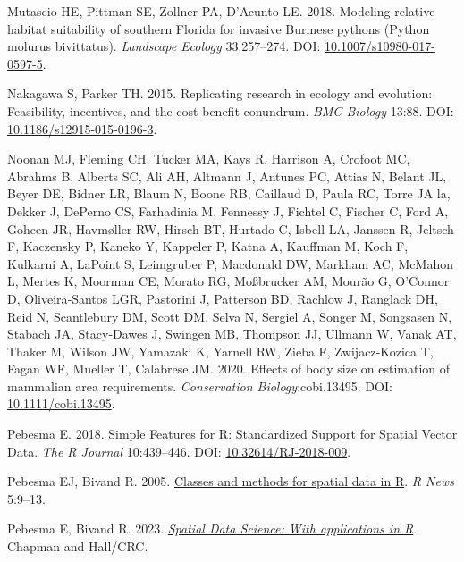 \documentclass[10pt,a4paper]{article}
\newlength{\cslhangindent}
\newenvironment{CSLReferences}[2] %
 {\begin{list}{}{%
  \setlength{\itemindent}{0pt}
  \setlength{\leftmargin}{0pt}
  \setlength{\parsep}{0pt}
  \ifodd #1
   \setlength{\leftmargin}{\cslhangindent}
   \setlength{\itemindent}{-1\cslhangindent}
  \fi
  \setlength{\itemsep}{#2\baselineskip}}}
 {\end{list}}
\begin{document}
\begin{CSLReferences}{1}{0}
Mutascio HE, Pittman SE, Zollner PA, D'Acunto LE. 2018. Modeling relative habitat suitability of southern {Florida} for invasive {Burmese} pythons ({Python} molurus bivittatus). \emph{Landscape Ecology} 33:257--274. DOI: \href{https://doi.org/10.1007/s10980-017-0597-5}{10.1007/s10980-017-0597-5}.

Nakagawa S, Parker TH. 2015. Replicating research in ecology and evolution: Feasibility, incentives, and the cost-benefit conundrum. \emph{BMC Biology} 13:88. DOI: \href{https://doi.org/10.1186/s12915-015-0196-3}{10.1186/s12915-015-0196-3}.

Noonan MJ, Fleming CH, Tucker MA, Kays R, Harrison A, Crofoot MC, Abrahms B, Alberts SC, Ali AH, Altmann J, Antunes PC, Attias N, Belant JL, Beyer DE, Bidner LR, Blaum N, Boone RB, Caillaud D, Paula RC, Torre JA la, Dekker J, DePerno CS, Farhadinia M, Fennessy J, Fichtel C, Fischer C, Ford A, Goheen JR, Havmøller RW, Hirsch BT, Hurtado C, Isbell LA, Janssen R, Jeltsch F, Kaczensky P, Kaneko Y, Kappeler P, Katna A, Kauffman M, Koch F, Kulkarni A, LaPoint S, Leimgruber P, Macdonald DW, Markham AC, McMahon L, Mertes K, Moorman CE, Morato RG, Moßbrucker AM, Mourão G, O'Connor D, Oliveira‐Santos LGR, Pastorini J, Patterson BD, Rachlow J, Ranglack DH, Reid N, Scantlebury DM, Scott DM, Selva N, Sergiel A, Songer M, Songsasen N, Stabach JA, Stacy‐Dawes J, Swingen MB, Thompson JJ, Ullmann W, Vanak AT, Thaker M, Wilson JW, Yamazaki K, Yarnell RW, Zieba F, Zwijacz‐Kozica T, Fagan WF, Mueller T, Calabrese JM. 2020. Effects of body size on estimation of mammalian area requirements. \emph{Conservation Biology}:cobi.13495. DOI: \href{https://doi.org/10.1111/cobi.13495}{10.1111/cobi.13495}.

Pebesma E. 2018. {Simple Features for R: Standardized Support for Spatial Vector Data}. \emph{{The R Journal}} 10:439--446. DOI: \href{https://doi.org/10.32614/RJ-2018-009}{10.32614/RJ-2018-009}.

Pebesma EJ, Bivand R. 2005. \href{https://CRAN.R-project.org/doc/Rnews/}{Classes and methods for spatial data in {R}}. \emph{R News} 5:9--13.

Pebesma E, Bivand R. 2023. \emph{\href{https://r-spatial.org/book/}{{Spatial Data Science: With applications in R}}}. {Chapman and Hall/CRC}.


\end{CSLReferences}
\end{document}
